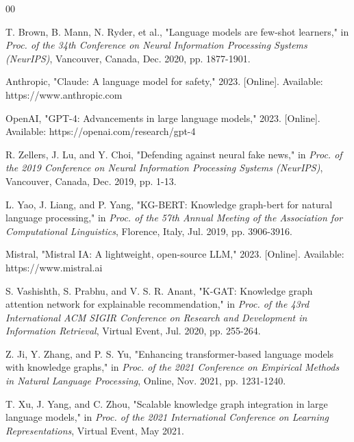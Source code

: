 \documentclass[conference]{IEEEtran}
\begin{document}
\begin{thebibliography}{00}

 T. Brown, B. Mann, N. Ryder, et al., "Language models are few-shot learners," in \textit{Proc. of the 34th Conference on Neural Information Processing Systems (NeurIPS)}, Vancouver, Canada, Dec. 2020, pp. 1877-1901.

 Anthropic, "Claude: A language model for safety," 2023. [Online]. Available: https://www.anthropic.com

 OpenAI, "GPT-4: Advancements in large language models," 2023. [Online]. Available: https://openai.com/research/gpt-4

 R. Zellers, J. Lu, and Y. Choi, "Defending against neural fake news," in \textit{Proc. of the 2019 Conference on Neural Information Processing Systems (NeurIPS)}, Vancouver, Canada, Dec. 2019, pp. 1-13.

 L. Yao, J. Liang, and P. Yang, "KG-BERT: Knowledge graph-bert for natural language processing," in \textit{Proc. of the 57th Annual Meeting of the Association for Computational Linguistics}, Florence, Italy, Jul. 2019, pp. 3906-3916.

 Mistral, "Mistral IA: A lightweight, open-source LLM," 2023. [Online]. Available: https://www.mistral.ai

 S. Vashishth, S. Prabhu, and V. S. R. Anant, "K-GAT: Knowledge graph attention network for explainable recommendation," in \textit{Proc. of the 43rd International ACM SIGIR Conference on Research and Development in Information Retrieval}, Virtual Event, Jul. 2020, pp. 255-264.

 Z. Ji, Y. Zhang, and P. S. Yu, "Enhancing transformer-based language models with knowledge graphs," in \textit{Proc. of the 2021 Conference on Empirical Methods in Natural Language Processing}, Online, Nov. 2021, pp. 1231-1240.

 T. Xu, J. Yang, and C. Zhou, "Scalable knowledge graph integration in large language models," in \textit{Proc. of the 2021 International Conference on Learning Representations}, Virtual Event, May 2021.




\end{thebibliography}
\end{document}
